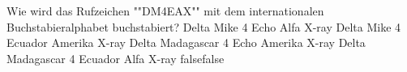     {Wie wird das Rufzeichen ""DM4EAX"" mit dem internationalen Buchstabieralphabet  buchstabiert?}
    {Delta Mike 4 Echo Alfa X-ray}
    {Delta Mike 4 Ecuador Amerika X-ray}
    {Delta Madagascar 4 Echo Amerika X-ray}
    {Delta Madagascar 4 Ecuador Alfa X-ray}
    {false}{false}